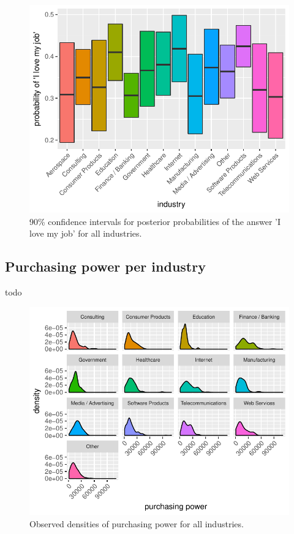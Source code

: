 \documentclass{article}
\begin{document}
\begin{figure}[H]
\centering
\includegraphics{report-038}
\caption{90\% confidence intervals for posterior probabilities of the answer 'I love my job' for all industries.}\label{fig_11}
\end{figure}

\subsection{Purchasing power per industry}
todo


\begin{figure}[H]
\centering
\includegraphics{report-040}
\caption{Observed densities of purchasing power for all industries.}\label{fig_12}
\end{figure}
\end{document}
